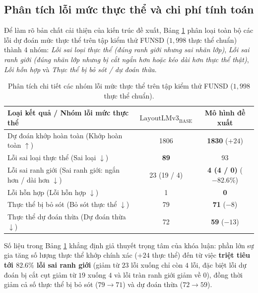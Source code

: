 \subsection{Phân tích lỗi mức thực thể và chi phí tính toán}
Để làm rõ bản chất cải thiện của kiến trúc đề xuất, Bảng \ref{tab:error_analysis} phân loại toàn bộ các lỗi dự đoán mức thực thể trên tập kiểm thử FUNSD ($1{,}998$ thực thể chuẩn) thành 4 nhóm: \textit{Lỗi sai loại thực thể (đúng ranh giới nhưng sai nhãn lớp)}, \textit{Lỗi sai ranh giới (đúng nhãn lớp nhưng bị cắt ngắn hơn hoặc kéo dài hơn thực thể thật)}, \textit{Lỗi hỗn hợp} và \textit{Thực thể bị bỏ sót / dự đoán thừa}.

\begin{table}[htbp]
\centering
\small
\caption{Phân tích chi tiết các nhóm lỗi mức thực thể trên tập kiểm thử FUNSD ($1{,}998$ thực thể chuẩn).}
\label{tab:error_analysis}
\renewcommand{\arraystretch}{1.2}
\begin{tabularx}{\textwidth}{|>{\RaggedRight\arraybackslash}X|c|c|}
\hline
\textbf{Loại kết quả / Nhóm lỗi mức thực thể} & \textbf{$\text{LayoutLMv3}_{\text{BASE}}$} & \textbf{Mô hình đề xuất} \\ \hline
Dự đoán khớp hoàn toàn (Khớp hoàn toàn $\uparrow$)        & 1806          & \textbf{1830} ($+24$) \\ \hline
Lỗi sai loại thực thể (Sai loại $\downarrow$)         & \textbf{89}   & 93 \\ \hline
Lỗi sai ranh giới (Sai ranh giới: ngắn hơn / dài hơn $\downarrow$) & 23 (19 / 4) & \textbf{4 (4 / 0)} ($-82.6\%$) \\ \hline
Lỗi hỗn hợp (Lỗi hỗn hợp $\downarrow$)                  & 1             & \textbf{0} \\ \hline
Thực thể bị bỏ sót (Bỏ sót thực thể $\downarrow$)       & 79            & \textbf{71} ($-8$) \\ \hline
Thực thể dự đoán thừa (Dự đoán thừa $\downarrow$) & 72          & \textbf{59} ($-13$) \\ \hline
\end{tabularx}
\end{table}

Số liệu trong Bảng \ref{tab:error_analysis} khẳng định giả thuyết trọng tâm của khóa luận: phần lớn sự gia tăng số lượng thực thể khớp chính xác ($+24$ thực thể) đến từ việc \textbf{triệt tiêu tới $82.6\%$ lỗi sai ranh giới} (giảm từ $23$ lỗi xuống chỉ còn $4$ lỗi, đặc biệt lỗi dự đoán bị cắt cụt giảm từ $19$ xuống $4$ và lỗi tràn ranh giới giảm về $0$), đồng thời giảm cả số thực thể bị bỏ sót ($79 \rightarrow 71$) và dự đoán thừa ($72 \rightarrow 59$).

